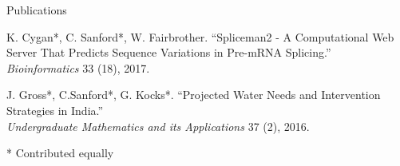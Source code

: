\documentclass{cv} %
\begin{document}
\begin{rSection}{Publications}

K. Cygan*, C. Sanford*, W. Fairbrother. ``Spliceman2 - A Computational Web Server That Predicts Sequence Variations in Pre-mRNA Splicing.'' \\
\textit{Bioinformatics} 33 (18), 2017.

J. Gross*, C.Sanford*, G. Kocks*. ``Projected Water Needs and
Intervention Strategies in India.''\\
\textit{Undergraduate Mathematics and its Applications} 37 (2), 2016.

* Contributed equally
\end{rSection}



\end{document}
